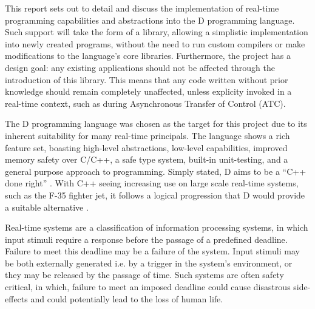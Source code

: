 






This report sets out to detail and discuss the implementation of real-time 
programming capabilities and abstractions into the D programming language. 
Such support will take the form of a library, allowing a simplistic implementation 
into newly created programs, without the need to run custom compilers or make
modifications to the language's core libraries. Furthermore, the project has a design 
goal: any existing applications should not be affected through the introduction 
of this library. This means that any code written without prior knowledge should 
remain completely unaffected, unless explicity invoked in a real-time context,
such as during Asynchronous Transfer of Control (ATC). 
\par\bigskip\noindent
The D programming language was chosen as the target for this project due to its 
inherent suitability for many real-time principals. The language shows a rich 
feature set, boasting high-level abstractions, low-level capabilities, 
improved memory safety over C/C++, a safe type 
system, built-in unit-testing,  and a general purpose approach 
to programming. Simply stated, D aims to be a ``C++ done right'' \cite{qznc-tutorial}. 
With C++ seeing increasing use on large scale real-time systems, such as the F-35 
fighter jet, it follows a logical progression that D would provide a suitable 
alternative \cite{f35}.
\par\bigskip\noindent
Real-time systems are a classification of 
information processing systems, in which input
stimuli require a response before the passage of a predefined deadline. Failure 
to meet this deadline may be a failure of the system. Input 
stimuli may be both externally generated i.e. by a trigger in the system's 
environment, or they may be released by the passage of time. Such systems are 
often safety critical, in which, failure to meet an imposed deadline could
cause disastrous side-effects and could potentially lead to the loss of human life. 
